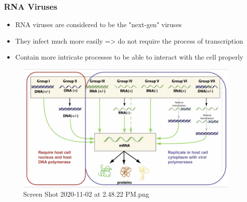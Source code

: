 \documentclass[letterpaper]{article}
\begin{document}
\subsubsection{RNA Viruses}
\label{sec:org77090c7}
\begin{itemize}
\item RNA viruses are considered to be the "next-gen" viruses
\item They infect much more easily => do not require the process of
transcription
\item Contain more intricate processes to be able to interact with the cell
properly
\end{itemize}

\begin{figure}[htbp]
\centering
\includegraphics[width=.9\linewidth]{Screen Shot 2020-11-02 at 2.48.22 PM.png}
\caption{Screen Shot 2020-11-02 at 2.48.22 PM.png}
\end{figure}
\end{document}
